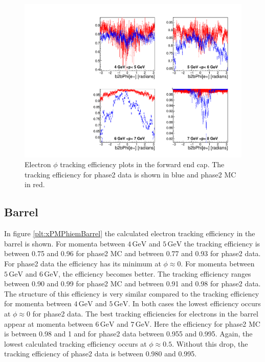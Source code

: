 \documentclass[a4paper,11pt,twosided,final,german,openbib,pdftex,listof=totoc,bibliography=totoc]{scrbook}
\begin{document}
\begin{figure}[!htbp]
	\centering
	\includegraphics[width=\textwidth]{Plots/master/xPMPhiemFC}
	\caption[Momentum $\phi$ Electron Forward End Cap Efficiency Phase2]{Electron $\phi$ tracking efficiency plots in the forward end cap. The tracking efficiency for phase2 data is shown in blue and phase2 MC in red.}
		\label{plt:xPMPhiemFC}
\end{figure}







\newpage



\subsection{Barrel}

In figure \ref{plt:xPMPhiemBarrel} the calculated electron tracking efficiency in the barrel is shown. For momenta between $4\,\textrm{GeV}$ and $5\,\textrm{GeV}$ the tracking efficiency is between 0.75 and 0.96 for phase2 MC and between 0.77 and 0.93 for phase2 data. For phase2 data the efficiency has its minimum at $\phi \approx 0$. For momenta between $5\,\textrm{GeV}$ and $6\,\textrm{GeV}$, the efficiency becomes better. The tracking efficiency ranges between 0.90 and 0.99 for phase2 MC and between 0.91 and 0.98 for phase2 data. The structure of this efficiency is very similar compared to the tracking efficiency for momenta between $4\,\textrm{GeV}$ and $5\,\textrm{GeV}$. In both cases the lowest efficiency occurs at $\phi \approx 0$ for phase2 data. The best tracking efficiencies for electrons in the barrel appear at momenta between $6\,\textrm{GeV}$ and $7\,\textrm{GeV}$. Here the efficiency for phase2 MC is between 0.98 and 1 and for phase2 data between 0.955 and 0.995. Again, the lowest calculated tracking efficiency occurs at  $\phi \approx 0.5$. Without this drop, the tracking efficiency of phase2 data is between 0.980 and 0.995. 
\end{document}
